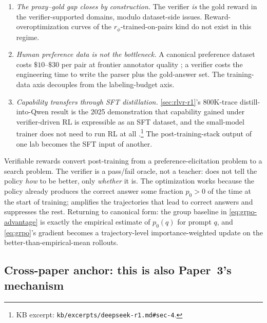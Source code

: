 \begin{enumerate}
\item \emph{The proxy--gold gap closes by construction.} The verifier
\emph{is} the gold reward in the verifier-supported domains, modulo
dataset-side issues. Reward-overoptimization curves of the
$r_\phi$-trained-on-pairs kind do not exist in this regime.
\item \emph{Human preference data is not the bottleneck.} A canonical
preference dataset costs $\$10$--$\$30$ per pair at frontier annotator
quality \citep[\S 3.4]{ouyang2022-instructgpt}; a verifier costs the
engineering time to write the parser plus the gold-answer set. The
training-data axis decouples from the labeling-budget axis.
\item \emph{Capability transfers through SFT distillation.}
\cref{sec:rlvr-r1}'s 800K-trace distill-into-Qwen result is the
2025 demonstration that capability gained under verifier-driven RL is
expressible as an SFT dataset, and the small-model trainer does not
need to run RL at all
\citep[\S 4]{deepseek-r1}.\footnote{KB excerpt:
\nolinkurl{kb/excerpts/deepseek-r1.md#sec-4}.} The post-training-stack
output of one lab becomes the SFT input of another.
\end{enumerate}

\begin{intuition}
Verifiable rewards convert post-training from a preference-elicitation
problem to a search problem. The verifier is a pass/fail oracle, not a
teacher:  does not tell the policy \emph{how} to be better, only
\emph{whether} it is. The optimization works because the policy already
produces the correct answer some fraction $p_0 > 0$ of the time at the
start of training;  amplifies the trajectories that lead to correct
answers and suppresses the rest. Returning to canonical form: the group
baseline in \cref{eq:grpo-advantage} is exactly the empirical estimate
of $p_0(q)$ for prompt $q$, and \cref{eq:grpo}'s gradient becomes a
trajectory-level importance-weighted update on the
better-than-empirical-mean rollouts.
\end{intuition}

\subsection{Cross-paper anchor: this is also Paper~3's mechanism}
\label{sec:rlvr-paper3-link}

